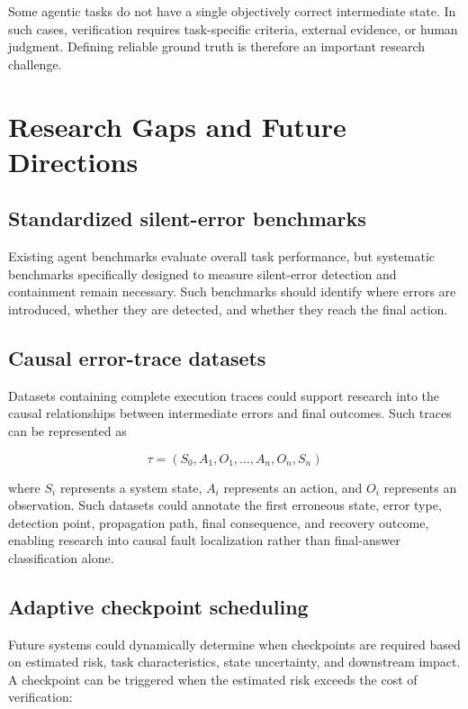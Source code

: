 \documentclass[12pt]{article}
\begin{document}
Some agentic tasks do not have a single objectively correct intermediate state.
In such cases, verification requires task-specific criteria, external evidence,
or human judgment. Defining reliable ground truth is therefore an important
research challenge.

\section{Research Gaps and Future Directions}
\label{sec:future-work}

\subsection{Standardized silent-error benchmarks}
\label{sec:silent-error-benchmarks}

Existing agent benchmarks evaluate overall task performance, but systematic
benchmarks specifically designed to measure silent-error detection and
containment remain necessary. Such benchmarks should identify where errors are
introduced, whether they are detected, and whether they reach the final action.

\subsection{Causal error-trace datasets}
\label{sec:causal-error-datasets}

Datasets containing complete execution traces could support research into the
causal relationships between intermediate errors and final outcomes. Such
traces can be represented as

\begin{equation}
\tau=(S_0,A_1,O_1,\ldots,A_n,O_n,S_n)
\label{eq:trajectory}
\end{equation}

where $S_i$ represents a system state, $A_i$ represents an action, and $O_i$
represents an observation. Such datasets could annotate the first erroneous
state, error type, detection point, propagation path, final consequence, and
recovery outcome, enabling research into causal fault localization rather
than final-answer classification alone.

\subsection{Adaptive checkpoint scheduling}
\label{sec:adaptive-checkpoints}

Future systems could dynamically determine when checkpoints are required based
on estimated risk, task characteristics, state uncertainty, and downstream
impact. A checkpoint can be triggered when the estimated risk exceeds the
cost of verification:
\end{document}
